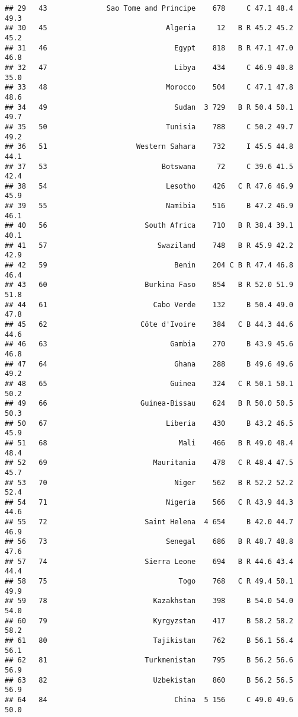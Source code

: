 \documentclass[]{article}
\begin{document}
\begin{verbatim}
## 29   43              Sao Tome and Principe    678     C 47.1 48.4 49.3
## 30   45                            Algeria     12   B R 45.2 45.2 45.2
## 31   46                              Egypt    818   B R 47.1 47.0 46.8
## 32   47                              Libya    434     C 46.9 40.8 35.0
## 33   48                            Morocco    504     C 47.1 47.8 48.6
## 34   49                              Sudan  3 729   B R 50.4 50.1 49.7
## 35   50                            Tunisia    788     C 50.2 49.7 49.2
## 36   51                     Western Sahara    732     I 45.5 44.8 44.1
## 37   53                           Botswana     72     C 39.6 41.5 42.4
## 38   54                            Lesotho    426   C R 47.6 46.9 45.9
## 39   55                            Namibia    516     B 47.2 46.9 46.1
## 40   56                       South Africa    710   B R 38.4 39.1 40.1
## 41   57                          Swaziland    748   B R 45.9 42.2 42.9
## 42   59                              Benin    204 C B R 47.4 46.8 46.4
## 43   60                       Burkina Faso    854   B R 52.0 51.9 51.8
## 44   61                         Cabo Verde    132     B 50.4 49.0 47.8
## 45   62                      Côte d'Ivoire    384   C B 44.3 44.6 44.6
## 46   63                             Gambia    270     B 43.9 45.6 46.8
## 47   64                              Ghana    288     B 49.6 49.6 49.2
## 48   65                             Guinea    324   C R 50.1 50.1 50.2
## 49   66                      Guinea-Bissau    624   B R 50.0 50.5 50.3
## 50   67                            Liberia    430     B 43.2 46.5 45.9
## 51   68                               Mali    466   B R 49.0 48.4 48.4
## 52   69                         Mauritania    478   C R 48.4 47.5 45.7
## 53   70                              Niger    562   B R 52.2 52.2 52.4
## 54   71                            Nigeria    566   C R 43.9 44.3 44.6
## 55   72                       Saint Helena  4 654     B 42.0 44.7 46.9
## 56   73                            Senegal    686   B R 48.7 48.8 47.6
## 57   74                       Sierra Leone    694   B R 44.6 43.4 44.4
## 58   75                               Togo    768   C R 49.4 50.1 49.9
## 59   78                         Kazakhstan    398     B 54.0 54.0 54.0
## 60   79                         Kyrgyzstan    417     B 58.2 58.2 58.2
## 61   80                         Tajikistan    762     B 56.1 56.4 56.1
## 62   81                       Turkmenistan    795     B 56.2 56.6 56.9
## 63   82                         Uzbekistan    860     B 56.2 56.5 56.9
## 64   84                              China  5 156     C 49.0 49.6 50.0

\end{verbatim}
\end{document}
